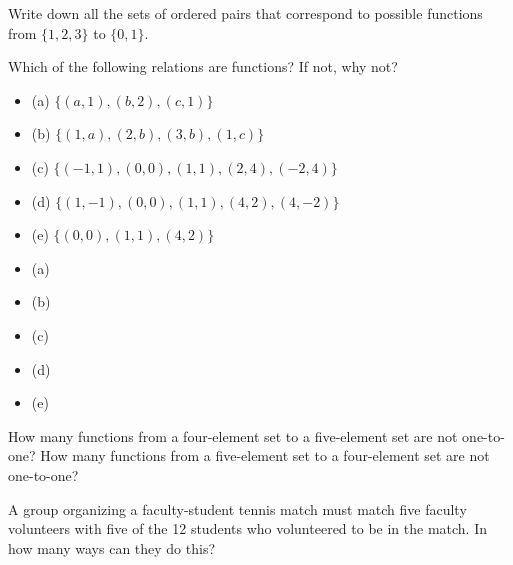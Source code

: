 \documentclass[12pt,letterpaper,boxed]{amspset}
\begin{document}
\begin{problem}[1.2.2]
Write down all the sets of ordered pairs that correspond to possible
functions from $\{ 1, 2, 3 \}$ to $\{0, 1 \}$.
\end{problem}

\begin{solution}

\end{solution}



\begin{problem}[1.2.8]
Which of the following relations are functions? If not, why not?
\begin{itemize}
  \item{(a)}      $\{ (a,1), (b,2), (c,1)\}$
  \item{(b)}      $\{ (1,a), (2,b), (3,b), (1,c)\}$
  \item{(c)}      $\{ (-1,1), (0,0), (1,1), (2,4), (-2,4)\}$
  \item{(d)}      $\{ (1,-1), (0,0), (1,1), (4,2), (4,-2) \}$
  \item{(e)}      $\{ (0,0), (1,1), (4,2)\}$
\end{itemize}
\end{problem}

\begin{solution}
\begin{itemize}
  \item{(a)}      
  \item{(b)}      
  \item{(c)}      
  \item{(d)}      
  \item{(e)}      
\end{itemize}

\end{solution}



\begin{problem}[1.2.10]
How many functions from a four-element set to a five-element set are
not one-to-one? How many functions from a five-element set to a
four-element set are not one-to-one?
\end{problem}

\begin{solution}

\end{solution}



\begin{problem}[1.2.12]
A group organizing a faculty-student tennis match must match five
faculty volunteers with five of the 12 students who volunteered to be
in the match. In how many ways can they do this?
\end{problem}
\end{document}
